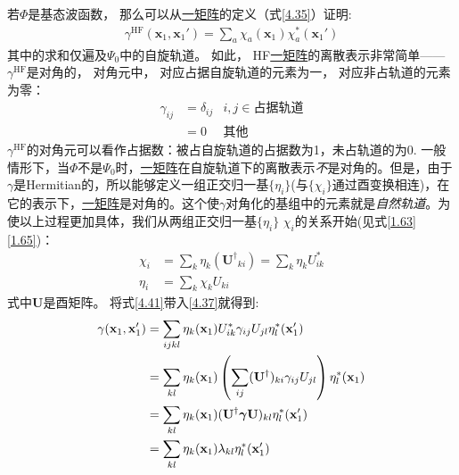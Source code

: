若$\Phi$是\hft 基态波函数，
那么可以从\underline{一矩阵}的定义（式\eqref{4.35}）证明:
\begin{align}
\gamma^\mathrm{HF}(\mathbf{x}_1,\mathbf{x}_1') = \sum_a \chi_a(\mathbf{x}_1)\chi_a^*(\mathbf{x}_1')
\end{align}
其中的求和仅遍及$\Psi_0$中的自旋轨道。
如此，
HF\underline{一矩阵}的离散表示非常简单——$\gamma^\mathrm{HF}$是对角的，
对角元中，
对应占据自旋轨道的元素为一，
对应非占轨道的元素为零：
\begin{equation}
\begin{aligned}
\gamma_{ij} & =\delta_{ij}&i,j\in\text{占据轨道}\\
            & = 0 &其他\label{4.40} 
\end{aligned}
\end{equation}
$\gamma^\mathrm{HF}$的对角元可以看作占据数：被占自旋轨道的占据数为1，未占轨道的为0.
一般情形下，当$\Phi$不是$\Psi_0$时，\underline{一矩阵}在\hft 自旋轨道下的离散表示\emph{不}是对角的。但是，由于$\gamma$是Hermitian的，所以能够定义一组正交归一基$\{\eta_i\}$(与$\{\chi_i\}$通过酉变换相连)，在它的表示下，\underline{一矩阵}是对角的。这个使$\gamma$对角化的基组中的元素就是\emph{自然轨道}。为使以上过程更加具体，我们从两组正交归一基$\{\eta_i\}$ $\chi_i$的关系开始(见式\eqref{1.63}\eqref{1.65})：
\begin{align}
\chi_i & = \sum_k \eta_k (\mathbf{U^\dagger}_{ki}) = \sum_k \eta_k U^*_{ik}\\
\eta_i & = \sum_k\chi_k U_{ki} \label{4.41}
\end{align}
式中$\mathbf{U}$是酉矩阵。
将式\eqref{4.41}带入\eqref{4.37}就得到:
\begin{align}
\gamma(\mathbf{x}_1,\mathbf{x}_1') & = \sum_{ijkl} \eta_k(\mathbf{x}_1) U^*_{ik} \gamma_{ij} U_{jl} \eta_l^*(\mathbf{x}_1')\notag\\
                                   & = \sum_{kl} \eta_k(\mathbf{x}_1) \left( \sum_{ij} (\mathbf{U}^\dagger)_{ki} \gamma_{ij} U_{jl}  \right) \eta_l^*(\mathbf{x}_1)\notag\\
                                   & = \sum_{kl} \eta_k(\mathbf{x}_1) (\mathbf{U}^\dagger \bm{\gamma}\mathbf{U})_{kl} \eta_l^*(\mathbf{x}_1')\notag\\
                                   & = \sum_{kl} \eta_k(\mathbf{x}_1) \lambda_{kl} \eta_l^*(\mathbf{x}_1')
\end{align}
